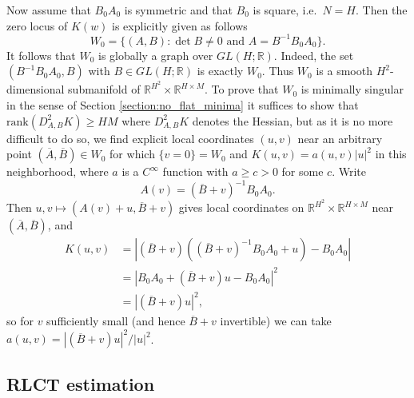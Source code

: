 \documentclass{article} %
\begin{document}
Now assume that $B_0A_0$ is symmetric and that $B_0$ is square,
i.e.\ $N = H$.  Then the zero locus of $K(w)$ is explicitly given as
follows
$$
W_0 = \{ (A, B) : \det B \neq 0 \mbox{ and } A = B^{-1}B_0A_0 \}.
$$
It follows that $W_0$ is globally a graph over $GL(H;
\mathbb{R})$.  Indeed, the set $(B^{-1}B_0 A_0, B)$ with $B \in GL(H;
\mathbb{R})$ is exactly $W_0$.  Thus $W_0$ is a smooth
$H^2$-dimensional submanifold of $\mathbb{R}^{H^2} \times
\mathbb{R}^{H \times M}$. To prove that $W_0$ is minimally singular in the sense of Section \ref{section:no_flat_minima} it suffices to show that $\mathrm{rank} ( D^2_{A,B}K) \ge HM$ where $D^2_{A,B} K$ denotes the Hessian, but as it is no more difficult to do so, we find explicit local
coordinates $(u, v)$ near an arbitrary point $(\overline{A},
\overline{B}) \in W_0$ for which $\{ v = 0 \} = W_0$
and $K(u, v) = a(u,v)|u|^2$ in this neighborhood, where $a$ is a
$C^\infty$ function with $a \ge c > 0$ for some $c$.  Write
$$
A(v) = (\overline{B} + v)^{-1}B_0 A_0.
$$
Then $u, v \mapsto (A(v) + u, \overline{B} + v)$ gives local
coordinates on $\mathbb{R}^{H^2} \times
\mathbb{R}^{H \times M}$ near $(\overline{A}, \overline{B})$, and
\begin{equation*}
\begin{split}
K(u, v) &= | (\overline{B} + v)( (\overline{B} + v)^{-1}B_0 A_0 + u) -
B_0 A_0 | \\
&= | B_0 A_0 +  (\overline{B} + v) u -
B_0 A_0 |^2 \\
&= | (\overline{B} + v) u |^2,
\end{split}
\end{equation*}
so for $v$ sufficiently small (and hence $\overline{B} + v$
invertible) we can take $a(u,v) = | (\overline{B} + v) u |^2 /
|u|^2$.  


\subsection{RLCT estimation} \label{appendix:RLCT_estimation}

\end{document}
